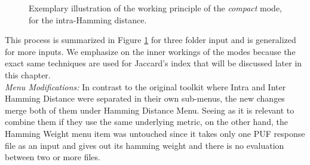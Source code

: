 \begin{figure}
\centering
{}
\caption{Exemplary illustration of the working principle of the \emph{compact} mode, for the intra-Hamming distance.}
\label{img:inter_compact}
\end{figure}

This process is summarized in Figure \ref{img:inter_compact} for three folder input and is generalized for more inputs. We emphasize on the inner workings of the modes because the exact same techniques are used for Jaccard's index that will be discussed later in this chapter.\\

\emph{Menu Modifications:} In contrast to the original toolkit where Intra and Inter Hamming Distance were separated in their own sub-menus, the new changes merge both of them under Hamming Distance Menu. Seeing as it is relevant to combine them if they use the same underlying metric, on the other hand, the Hamming Weight menu item was untouched since it takes only one PUF response file as an input and gives out its hamming weight and there is no evaluation between two or
more files.\\


